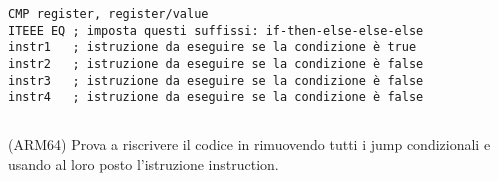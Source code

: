 \begin{lstlisting}[caption=ARM (\ThumbMode),style=customasmARM]
CMP register, register/value
ITEEE EQ ; imposta questi suffissi: if-then-else-else-else
instr1   ; istruzione da eseguire se la condizione è true
instr2   ; istruzione da eseguire se la condizione è false
instr3   ; istruzione da eseguire se la condizione è false
instr4   ; istruzione da eseguire se la condizione è false
\end{lstlisting}

\subsection{\Exercise}

(ARM64) Prova a riscrivere il codice in  rimuovendo tutti i jump condizionali e usando al loro posto l'istruzione  instruction.

